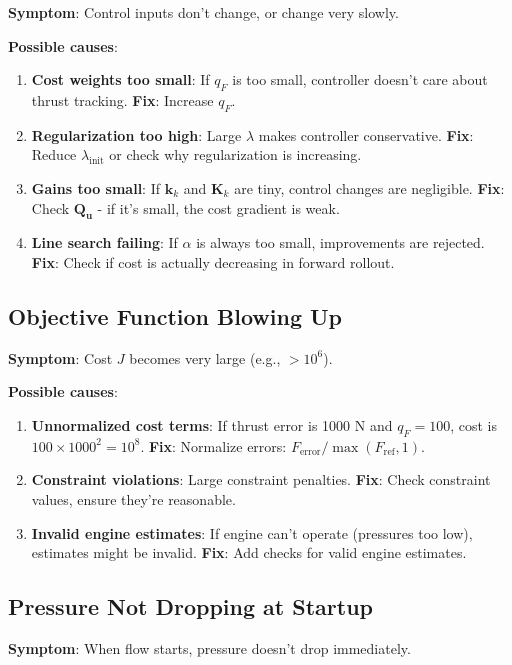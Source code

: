 \documentclass[11pt,a4paper]{article}
\begin{document}
\textbf{Symptom}: Control inputs don't change, or change very slowly.

\textbf{Possible causes}:
\begin{enumerate}
    \item \textbf{Cost weights too small}: If $q_F$ is too small, controller doesn't care about thrust tracking. \textbf{Fix}: Increase $q_F$.
    \item \textbf{Regularization too high}: Large $\lambda$ makes controller conservative. \textbf{Fix}: Reduce $\lambda_{\text{init}}$ or check why regularization is increasing.
    \item \textbf{Gains too small}: If $\mathbf{k}_k$ and $\mathbf{K}_k$ are tiny, control changes are negligible. \textbf{Fix}: Check $\mathbf{Q}_{\mathbf{u}}$ - if it's small, the cost gradient is weak.
    \item \textbf{Line search failing}: If $\alpha$ is always too small, improvements are rejected. \textbf{Fix}: Check if cost is actually decreasing in forward rollout.
\end{enumerate}

\subsection{Objective Function Blowing Up}

\textbf{Symptom}: Cost $J$ becomes very large (e.g., $> 10^6$).

\textbf{Possible causes}:
\begin{enumerate}
    \item \textbf{Unnormalized cost terms}: If thrust error is 1000 N and $q_F = 100$, cost is $100 \times 1000^2 = 10^8$. \textbf{Fix}: Normalize errors: $F_{\text{error}} / \max(F_{\text{ref}}, 1)$.
    \item \textbf{Constraint violations}: Large constraint penalties. \textbf{Fix}: Check constraint values, ensure they're reasonable.
    \item \textbf{Invalid engine estimates}: If engine can't operate (pressures too low), estimates might be invalid. \textbf{Fix}: Add checks for valid engine estimates.
\end{enumerate}

\subsection{Pressure Not Dropping at Startup}

\textbf{Symptom}: When flow starts, pressure doesn't drop immediately.
\end{document}

